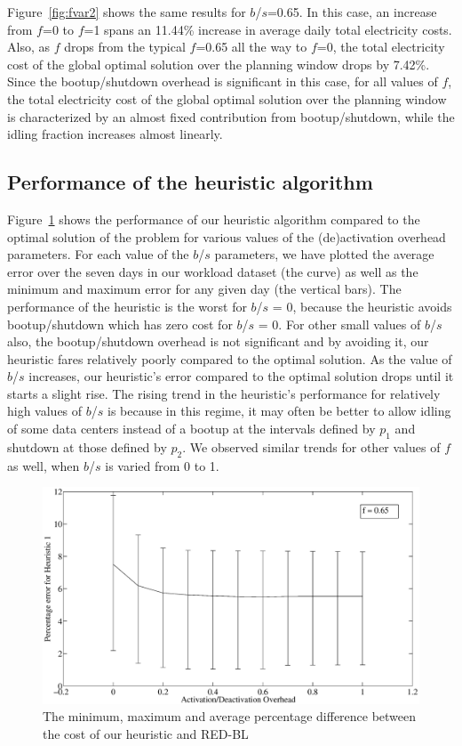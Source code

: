 Figure~\ref{fig:fvar2} shows the same results for $b$/$s$=0.65. In this case, an increase from $f$=0 to $f$=1 spans an 11.44\% increase in average daily total electricity costs. Also, as $f$ drops from the typical $f$=0.65 all the way to $f$=0, the total electricity cost of the global optimal solution over the planning window drops by 7.42\%. Since the bootup/shutdown overhead is significant in this case, for all values of $f$, the total electricity cost of the global optimal solution over the planning window is characterized by an almost fixed contribution from bootup/shutdown, while the idling fraction increases almost linearly.

\subsection{Performance of the heuristic algorithm}
Figure~\ref{fig:heur1perf} shows the performance of our heuristic algorithm compared to the optimal solution of the problem for various values of the (de)activation overhead parameters. For each value of the $b$/$s$ parameters, we have plotted the average error over the seven days in our workload dataset (the curve) as well as the minimum and maximum error for any given day (the vertical bars). The performance of the heuristic is the worst for $b$/$s$ = 0, because the heuristic avoids bootup/shutdown which has zero cost for $b$/$s$ = 0. For other small values of $b$/$s$ also, the bootup/shutdown overhead is not significant and by avoiding it, our heuristic fares relatively poorly compared to the optimal solution. As the value of $b$/$s$ increases, our heuristic's error compared to the optimal solution drops until it starts a slight rise. The rising trend in the heuristic's performance for relatively high values of $b$/$s$ is because in this regime, it may often be better to allow idling of some data centers instead of a bootup at the intervals defined by $p_1$ and shutdown at those defined by $p_2$. We observed similar trends for other values of $f$ as well, when $b$/$s$ is varied from 0 to 1.

\begin{figure}
\includegraphics[width=0.8\linewidth]{pics/rb-heur1error.eps}
\caption{The minimum, maximum and average percentage difference between the cost of our heuristic and RED-BL}
\label{fig:heur1perf}
\end{figure}

